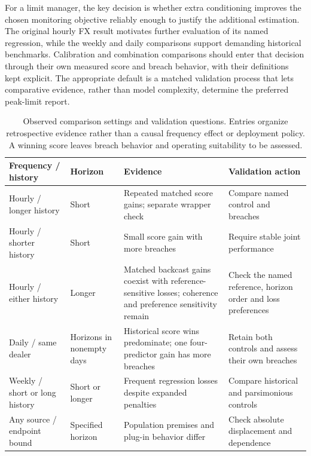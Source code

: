 \documentclass[11pt,a4paper]{article}
\begin{document}
For a limit manager, the key decision is whether extra conditioning improves the chosen monitoring objective reliably enough to justify the additional estimation. The original hourly FX result motivates further evaluation of its named regression, while the weekly and daily comparisons support demanding historical benchmarks. Calibration and combination comparisons should enter that decision through their own measured score and breach behavior, with their definitions kept explicit. The appropriate default is a matched validation process that lets comparative evidence, rather than model complexity, determine the preferred peak-limit report.


\begin{table}[htbp]\centering\small
\caption{Observed comparison settings and validation questions. Entries organize retrospective evidence rather than a causal frequency effect or deployment policy. A winning score leaves breach behavior and operating suitability to be assessed.}\label{tab:map}
\begin{tabular}{>{\raggedright\arraybackslash}p{3.3cm}>{\raggedright\arraybackslash}p{3.7cm}>{\raggedright\arraybackslash}p{4.0cm}>{\raggedright\arraybackslash}p{3.2cm}}\toprule
Frequency / history & Horizon & Evidence & Validation action\\\midrule
Hourly / longer history & Short & Repeated matched score gains; separate wrapper check & Compare named control and breaches\\
Hourly / shorter history & Short & Small score gain with more breaches & Require stable joint performance\\
Hourly / either history & Longer & Matched backcast gains coexist with reference-sensitive losses; coherence and preference sensitivity remain & Check the named reference, horizon order and loss preferences\\
Daily / same dealer & Horizons in nonempty days & Historical score wins predominate; one four-predictor gain has more breaches & Retain both controls and assess their own breaches\\
Weekly / short or long history & Short or longer & Frequent regression losses despite expanded penalties & Compare historical and parsimonious controls\\
Any source / endpoint bound & Specified horizon & Population premises and plug-in behavior differ & Check absolute displacement and dependence\\
\bottomrule\end{tabular}

\end{table}
\end{document}
